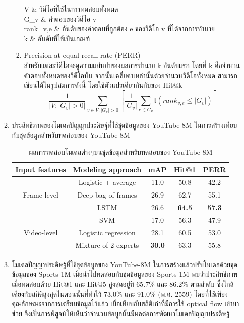 \begin{enumerate}
\begin{enumerate}
\begin{enumerate}
\begin{conditions}
					V & วิดีโอที่ใช้ในการทดสอบทั้งหมด\\
					G_v & คำตอบของวิดีโอ v\\
					rank_{v,e} & อันดับของคำตอบที่ถูกต้อง e ของวิดีโอ v ที่ได้จากการทำนาย\\
					k & อันดับที่ใช้เป็นเกณฑ์
				\end{conditions}
				\item Precision at equal recall rate (PERR)\\
				สำหรับแต่ละวิดีโอจะดูความแม่นยำของผลการทำนาย k อันดับแรก โดยที่ k คือจำนวนคำตอบทั้งหมดของวิดีโอนั้น จากนั้นเฉลี่ยค่าเหล่านั้นด้วยจำนวนวิดีโอทั้งหมด
				สามารถเขียนได้ในรูปสมการดังนี้ โดยใช้ตัวแปรเดียวกันกับของ Hit@k
				\begin{equation}
					\frac{1}{|V :|G_v|>0|}\sum_{v\in V:|G_v|>0}\left [\frac{1}{|G_v|}\sum_{e\in G_v}\mathbb{I}(rank_{v,e} \leq |G_v|) \right ]
				\end{equation}
			\end{enumerate}
		\item ประสิทธิภาพของโมเดลปัญญาประดิษฐ์ที่ใช้ชุดข้อมูลของ YouTube-8M ในการสร้างเทียบกับชุดข้อมูลสำหรับทดสอบของ YouTube-8M
			\begin{table}[!ht]
				\centering
				\begin{tabular}{|c|c|c|c|c|}
					\hline
					{Input features} & {Modeling approach} & {mAP} & Hit@1 & PERR\\
					\hline
					\multirow{3}{*}{Frame-level} & Logistic + average & 11.0 & 50.8 & 42.2\\
					& Deep bag of frames & 26.9 & 62.7 & 55.1\\
					& LSTM & 26.6 & \textbf{64.5} & \textbf{57.3}\\
					\hline
					\multirow{3}{*}{Video-level} & SVM & 17.0 & 56.3 & 47.9\\
					& Logistic regression & 28.1 & 60.5 & 53.0\\
					& Mixture-of-2-experts & \textbf{30.0} & 63.3 & 55.8\\
					\hline
				\end{tabular}
				\caption{ผลการทดสอบโมเดลต่างๆบนชุดข้อมูลสำหรับทดสอบของ YouTube-8M}
				\label{tab: youtube_youtube}
			\end{table}
			\clearpage
		\item โมเดลปัญญาประดิษฐ์ที่ใช้ชุดข้อมูลของ YouTube-8M ในการสร้างแล้วปรับโมเดลด้วยชุดข้อมูลของ Sports-1M เมื่อนำไปทดสอบกับชุดข้อมูลของ Sports-1M 
		พบว่าประสิทธิภาพเมื่อทดสอบด้วย Hit@1 และ Hit@5 สูงสุดอยู่ที่ 65.7\% และ 86.2\% ตามลำดับ ซึ่งใกล้เคียงกับสถิติสูงสุดในตอนนั้นที่ทำไว้ 73.0\% และ 91.0\% (พ.ศ. 2559) 
		โดยที่ใช้เพียงคุณลักษณะจากการเตรียมข้อมูลไว้แล้ว เมื่อเทียบกับสถิติเก่าที่มีการใช้ optical flow เข้ามาช่วย จึงเป็นการพิสูจน์ให้เห็นว่าจำนวนข้อมูลนั้นมีผลต่อการพัฒนาโมเดลปัญญาประดิษฐ์
			

\end{enumerate}
\end{enumerate}
